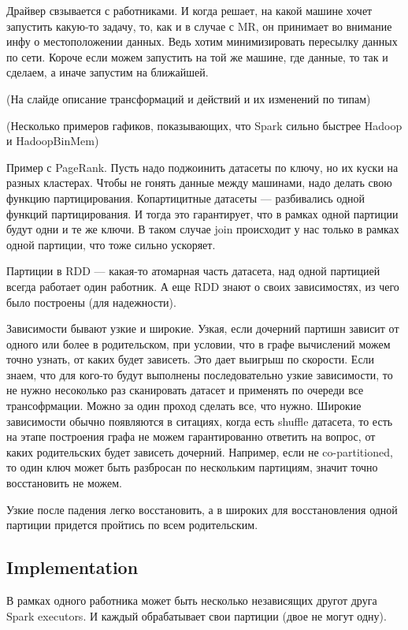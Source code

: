 \documentclass[12pt]{article}
\begin{document}
Драйвер свзывается с работниками. И когда решает, на какой машине хочет запустить какую-то задачу, то, как и в случае с MR, он принимает во внимание инфу о местоположении данных. Ведь хотим минимизировать пересылку данных по сети. Короче если можем запустить на той же машине, где данные, то так и сделаем, а иначе запустим на ближайшей.

(На слайде описание трансформаций и действий и их изменений по типам)

(Несколько примеров гафиков, показывающих, что Spark сильно быстрее Hadoop и HadoopBinMem)

Пример с PageRank. Пусть надо поджоинить датасеты по ключу, но их куски на разных кластерах. Чтобы не гонять данные между машинами, надо делать свою функцию партицирования. Копартицитные датасеты --- разбивались одной функций партицирования. И тогда это гарантирует, что в рамках одной партиции будут одни и те же ключи. В таком случае join происходит у нас только в рамках одной партиции, что тоже сильно ускоряет.

Партиции в RDD --- какая-то атомарная часть датасета, над одной партицией всегда работает один работник. А еще RDD знают о своих зависимостях, из чего было построены (для надежности).

Зависимости бывают узкие и широкие. Узкая, если дочерний партишн зависит от одного или более в родительском, при условии, что в графе вычислений можем точно узнать, от каких будет зависеть. Это дает выигрыш по скорости. Если знаем, что для кого-то будут выполнены последовательно узкие зависимости, то не нужно несоколько раз сканировать датасет и применять по очереди все трансофрмации. Можно за один проход сделать все, что нужно. Широкие зависимости обычно появляются в ситациях, когда есть shuffle датасета, то есть на этапе построения графа не можем гарантированно ответить на вопрос, от каких родительских будет зависеть дочерний. Например, если не co-partitioned, то один ключ может быть разбросан по нескольким партициям, значит точно восстановить не можем. 

Узкие после падения легко восстановить, а в широких для восстановления одной партиции придется пройтись по всем родительским.
    
\subsection{Implementation} 

В рамках одного работника может быть несколько независящих другот друга Spark executors. И каждый обрабатывает свои партиции (двое не могут одну). 
\end{document}
